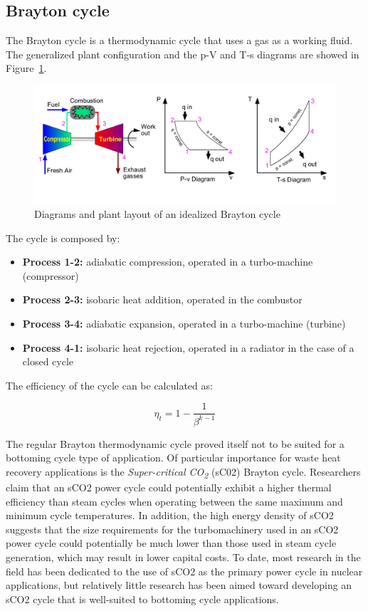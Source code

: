 \subsection{Brayton cycle}

The Brayton cycle is a thermodynamic cycle that uses a gas as a working fluid. The generalized plant configuration and the p-V and T-s diagrams are showed in Figure~\ref{fig:brayton_cycle}.

\begin{figure}[ht]
  \centering
  \includegraphics[width=\textwidth]{figures/review/brayton_cycle.jpg}
  \caption{Diagrams and plant layout of an idealized Brayton cycle\label{fig:brayton_cycle} }
\end{figure}

The cycle is composed by:

\begin{itemize}
\item \textbf{Process 1-2:} adiabatic compression, operated in a turbo-machine (compressor)
\item \textbf{Process 2-3:} isobaric heat addition, operated in the combustor
\item \textbf{Process 3-4:} adiabatic expansion, operated in a turbo-machine (turbine)
\item \textbf{Process 4-1:} isobaric heat rejection, operated in a radiator in the case of a closed cycle
\end{itemize}

The efficiency of the cycle can be calculated as:

\begin{equation}
  \eta_{t}=1-\frac{1}{\beta^{k-1}}
\end{equation}

The regular Brayton thermodynamic cycle proved itself not to be suited for a bottoming cycle type of application. Of particular importance for waste heat recovery applications is the \emph{Super-critical CO\textsubscript{2}} (sC02) Brayton cycle. Researchers claim \cite{Kimzey2012} that an sCO2 power cycle could potentially exhibit a higher thermal efficiency than steam cycles when operating between the same maximum and minimum cycle temperatures. In addition, the high energy density of sCO2 suggests that the size requirements for the turbomachinery used in an sCO2 power cycle could potentially be much lower than those used in steam cycle generation, which may result in lower capital costs. To date, most research in the field has been dedicated to the use of sCO2 as the primary power cycle in nuclear applications, but relatively little research has been aimed toward developing an sCO2 cycle that is well-suited to bottoming cycle applications.

